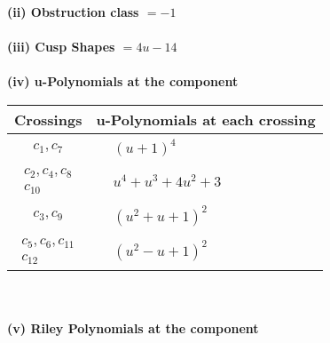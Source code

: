 \documentclass[1p]{elsarticle_modified}
\theoremstyle{definition}
\begin{document}
\flushleft \textbf{(ii) Obstruction class $= -1$}\\~\\
\flushleft \textbf{(iii) Cusp Shapes $= 4 u-14$}\\~\\
\newpage\renewcommand{\arraystretch}{1}
\flushleft \textbf{(iv) u-Polynomials at the component}\newline \\
\begin{tabular}{m{50pt}|m{274pt}}
Crossings & \hspace{64pt}u-Polynomials at each crossing \\
\hline $$\begin{aligned}c_{1},c_{7}\end{aligned}$$&$\begin{aligned}
&(u+1)^4
\end{aligned}$\\
\hline $$\begin{aligned}c_{2},c_{4},c_{8}\\c_{10}\end{aligned}$$&$\begin{aligned}
&u^4+u^3+4 u^2+3
\end{aligned}$\\
\hline $$\begin{aligned}c_{3},c_{9}\end{aligned}$$&$\begin{aligned}
&(u^2+u+1)^2
\end{aligned}$\\
\hline $$\begin{aligned}c_{5},c_{6},c_{11}\\c_{12}\end{aligned}$$&$\begin{aligned}
&(u^2- u+1)^2
\end{aligned}$\\
\hline
\end{tabular}\\~\\
\newpage\renewcommand{\arraystretch}{1}
\flushleft \textbf{(v) Riley Polynomials at the component}\newline \\
\end{document}
